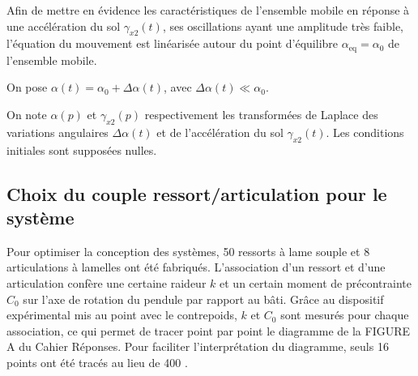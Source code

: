 
Afin de mettre en évidence les caractéristiques de l'ensemble mobile en réponse à une accélération du sol $\gamma_{x 2}(t)$, ses oscillations ayant une amplitude très faible, l'équation du mouvement est linéarisée autour du point d'équilibre $\alpha_{\mathrm{eq}}=\alpha_{0}$ de l'ensemble mobile.

On pose $\alpha(t)=\alpha_{0}+\Delta \alpha(t)$, avec $\Delta \alpha(t) \ll \alpha_{0}$.


On note $\alpha(p)$ et $\gamma_{x 2}(p)$ respectivement les transformées de Laplace des variations angulaires $\Delta \alpha(t)$ et de l'accélération du sol $\gamma_{x 2}(t)$. Les conditions initiales sont supposées nulles.




\subsection{Choix du couple ressort/articulation pour le système}
Pour optimiser la conception des systèmes, 50 ressorts à lame souple et 8 articulations à lamelles ont été fabriqués. L'association d'un ressort et d'une articulation confère une certaine raideur $k$ et un certain moment de précontrainte $C_{0}$ sur l'axe de rotation du pendule par rapport au bâti. Grâce au dispositif expérimental mis au point avec le contrepoids, $k$ et $C_{0}$ sont mesurés pour chaque association, ce qui permet de tracer point par point le diagramme de la FIGURE A du Cahier Réponses. Pour faciliter l'interprétation du diagramme, seuls 16 points ont été tracés au lieu de 400 .

